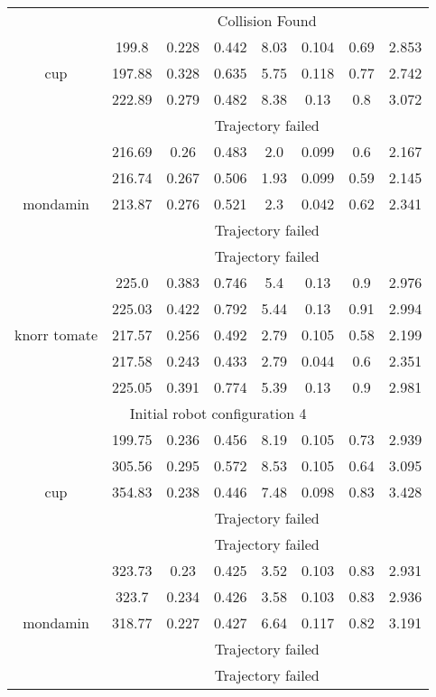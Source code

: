 {\begin{center}
\begin{longtable}[c]{ | c | c | c | c | c | c | c || c || }
\hline
\multirow{5}{1.5cm}{cup}& \multicolumn{7}{c|}{Collision Found} \\
& 199.8 & 0.228 & 0.442 & 8.03 & 0.104 & 0.69 & 2.853 \\
& 197.88 & 0.328 & 0.635 & 5.75 & 0.118 & 0.77 & 2.742 \\
& 222.89 & 0.279 & 0.482 & 8.38 & 0.13 & 0.8 & 3.072 \\
& \multicolumn{7}{c|}{Trajectory failed} \\
\hline 
\multirow{5}{1.5cm}{mondamin}& 216.69 & 0.26 & 0.483 & 2.0 & 0.099 & 0.6 & 2.167 \\
& 216.74 & 0.267 & 0.506 & 1.93 & 0.099 & 0.59 & 2.145 \\
& 213.87 & 0.276 & 0.521 & 2.3 & 0.042 & 0.62 & 2.341 \\
& \multicolumn{7}{c|}{Trajectory failed} \\
& \multicolumn{7}{c|}{Trajectory failed} \\
\hline 
\multirow{5}{1.5cm}{knorr tomate}& 225.0 & 0.383 & 0.746 & 5.4 & 0.13 & 0.9 & 2.976 \\
& 225.03 & 0.422 & 0.792 & 5.44 & 0.13 & 0.91 & 2.994 \\
& 217.57 & 0.256 & 0.492 & 2.79 & 0.105 & 0.58 & 2.199 \\
& 217.58 & 0.243 & 0.433 & 2.79 & 0.044 & 0.6 & 2.351 \\
& 225.05 & 0.391 & 0.774 & 5.39 & 0.13 & 0.9 & 2.981 \\
\hline 
\multicolumn{8}{|c|}{Initial robot configuration 4} \\
\hline
\multirow{5}{1.5cm}{cup}& 199.75 & 0.236 & 0.456 & 8.19 & 0.105 & 0.73 & 2.939 \\
& 305.56 & 0.295 & 0.572 & 8.53 & 0.105 & 0.64 & 3.095 \\
& 354.83 & 0.238 & 0.446 & 7.48 & 0.098 & 0.83 & 3.428 \\
& \multicolumn{7}{c|}{Trajectory failed} \\
& \multicolumn{7}{c|}{Trajectory failed} \\
\hline 
\multirow{5}{1.5cm}{mondamin}& 323.73 & 0.23 & 0.425 & 3.52 & 0.103 & 0.83 & 2.931 \\
& 323.7 & 0.234 & 0.426 & 3.58 & 0.103 & 0.83 & 2.936 \\
& 318.77 & 0.227 & 0.427 & 6.64 & 0.117 & 0.82 & 3.191 \\
& \multicolumn{7}{c|}{Trajectory failed} \\
& \multicolumn{7}{c|}{Trajectory failed} \\
\hline 

\end{longtable}
\end{center}}
